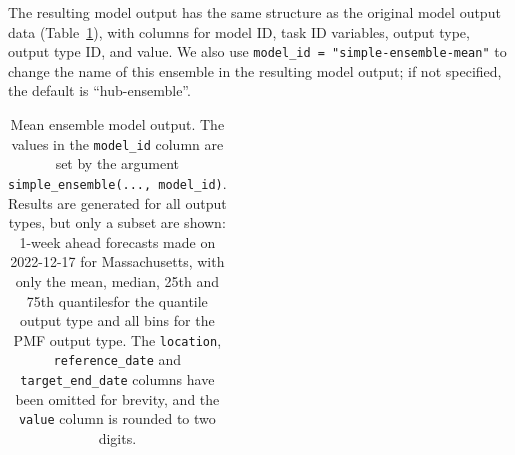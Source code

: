 \documentclass[
  letterpaper,
  DIV=11,
  numbers=noendperiod]{scrartcl}
\begin{document}
The resulting model output has the same structure as the original model
output data (Table~\ref{tbl-mean-ensemble}), with columns for model ID,
task ID variables, output type, output type ID, and value. We also use
\texttt{model\_id\ =\ "simple-ensemble-mean"} to change the name of this
ensemble in the resulting model output; if not specified, the default is
``hub-ensemble''.

\begin{longtable}[]{@{}
  >{\raggedright\arraybackslash}p{}
  >{\raggedright\arraybackslash}p{}
  >{\raggedleft\arraybackslash}p{}
  >{\raggedright\arraybackslash}p{}
  >{\raggedright\arraybackslash}p{}
  >{\raggedleft\arraybackslash}p{}@{}}

\caption{\label{tbl-mean-ensemble}Mean ensemble model output. The values
in the \texttt{model\_id} column are set by the argument
\texttt{simple\_ensemble(...,\ model\_id)}. Results are generated for
all output types, but only a subset are shown: 1-week ahead forecasts
made on 2022-12-17 for Massachusetts, with only the mean, median, 25th
and 75th quantilesfor the quantile output type and all bins for the PMF
output type. The \texttt{location}, \texttt{reference\_date} and
\texttt{target\_end\_date} columns have been omitted for brevity, and
the \texttt{value} column is rounded to two digits.}

\tabularnewline


\end{longtable}
\end{document}
